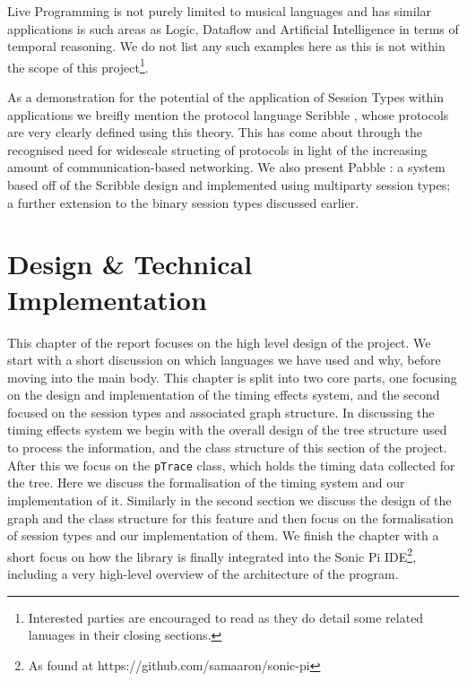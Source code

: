 \documentclass[11pt, abstracton, twoside]{scrartcl}
\begin{document}
Live Programming is not purely limited to musical languages and has similar 
applications is such areas as Logic, Dataflow and Artificial Intelligence in
terms of temporal reasoning. We do not list any such examples here as this is
not within the scope of this project\footnote{Interested parties are encouraged
to read \cite{AOB14} as they do detail some related lanuages in their closing 
sections.}.

As a demonstration for the potential of the application of Session Types 
within applications we breifly mention the protocol language Scribble 
\cite{HMBCY11}, whose protocols are very clearly defined using this theory. 
This has come about through the recognised need for widescale structing of 
protocols in light of the increasing amount of communication-based networking. 
We also present Pabble \cite{NY14}: a system based off of the Scribble design 
and implemented using multiparty session types; a further extension to the 
binary session types discussed earlier.
\newpage

\section{Design \& Technical Implementation}
\thispagestyle{empty}
This chapter of the report focuses on the high level design of the project.
We start with a short discussion on which languages we have used and why, before
moving into the main body. This chapter is split into two core parts, one 
focusing on the design and implementation of the timing effects system, and
the second focused on the session types and associated graph structure. In 
discussing the timing effects system we begin with the overall design of the tree
structure used to process the information, and the class structure of this section
of the project. After this we focus on the \texttt{pTrace} class, which holds
the timing data collected for the tree. Here we discuss the formalisation of the
timing system and our implementation of it. Similarly in the second section we
discuss the design of the graph and the class structure for this feature and then
focus on the formalisation of session types and our implementation of them. We 
finish the chapter with a short focus on how the library is finally integrated
into the Sonic Pi IDE\footnote{As found at https://github.com/samaaron/sonic-pi}, 
including a very high-level overview of the architecture of the program.
\end{document}
